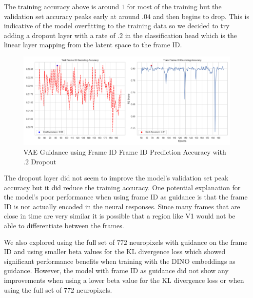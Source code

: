 \documentclass[12pt, letterpaper]{article}
\begin{document}
The training accuracy above is around $1$ for most of the training but the validation set accuracy peaks early at around $.04$ and then begins to drop. This is indicative of the model overfitting to the training data so we decided to try adding a dropout layer with a rate of $.2$ in the classification head which is the linear layer mapping from the latent space to the frame ID. 

\begin{figure}[H]
    \centering
    \includegraphics[width=1.0\textwidth]{frame_id_accuracy_128dim_503_top_var_200_epochs_0.05_beta_2_layer_.2_dropout.png}
    \caption{VAE Guidance using Frame ID Frame ID Prediction Accuracy with .2 Dropout}
    \label{fig:vae_guidance_frame_id_accuracy_dropout}
\end{figure}

The dropout layer did not seem to improve the model's validation set peak accuracy but it did reduce the training accuracy. One potential explanation for the model's poor performance when using frame ID as guidance is that the frame ID is not actually encoded in the neural responses. Since many frames that are close in time are very similar it is possible that a region like V1 would not be able to differentiate between the frames. 

We also explored using the full set of $772$ neuropixels with guidance on the frame ID and using smaller beta values for the KL divergence loss which showed significant performance benefits when training with the DINO embeddings as guidance. However, the model with frame ID as guidance did not show any improvements when using a lower beta value for the KL divergence loss or when using the full set of $772$ neuropixels.
\end{document}
